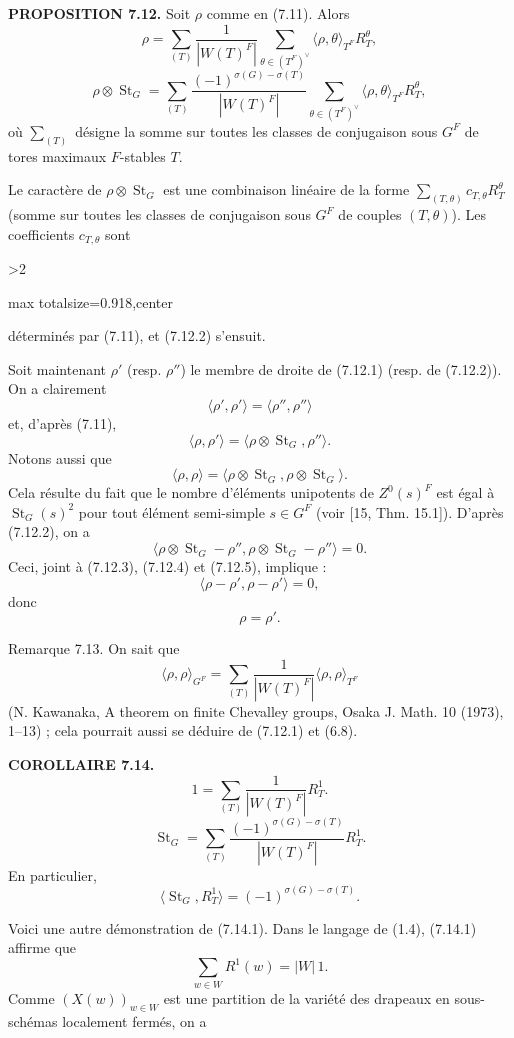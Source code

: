 \documentclass[9pt,twoside]{extarticle}
\newcommand{\EditionPage}[3]{%
  \ifnum#1>2\clearpage\fi
  \pdfbookmark[1]{Printed page #2}{fr-folio-#2}%
  \hypertarget{fr-physical-#1}{}%
  \noindent\begin{adjustbox}{max totalsize={\textwidth}{0.918\textheight},center}
  \begin{minipage}[t]{\textwidth}
  \fontsize{9.4}{11.1}\selectfont\justifying
  #3
  \end{minipage}
  \end{adjustbox}%
}
\begin{document}
{\noindent\textbf{PROPOSITION 7.12.} Soit \(\rho\) comme en (7.11). Alors \[
\tag{7.12.1}
\rho=
\sum_{(T)}\frac1{|W(T)^F|}
\sum_{\theta\in(T^F)^\vee}
\langle\rho,\theta\rangle_{T^F}R_T^\theta,
\]  \[
\tag{7.12.2}
\rho\otimes\operatorname{St}_G=
\sum_{(T)}\frac{(-1)^{\sigma(G)-\sigma(T)}}{|W(T)^F|}
\sum_{\theta\in(T^F)^\vee}
\langle\rho,\theta\rangle_{T^F}R_T^\theta,
\] où \(\sum_{(T)}\) désigne la somme sur toutes les classes de conjugaison sous \(G^F\) de tores maximaux \(F\)-stables \(T\).\par

Le caractère de \(\rho\otimes\operatorname{St}_G\) est une combinaison linéaire de la forme \(\sum_{(T,\theta)}c_{T,\theta}R_T^\theta\) (somme sur toutes les classes de conjugaison sous \(G^F\) de couples \((T,\theta)\)). Les coefficients \(c_{T,\theta}\) sont\par
}

\EditionPage{44}{145}{%
déterminés par (7.11), et (7.12.2) s'ensuit.\par

Soit maintenant \(\rho'\) (resp. \(\rho''\)) le membre de droite de (7.12.1) (resp. de (7.12.2)). On a clairement \[
\tag{7.12.3}
\langle\rho',\rho'\rangle=\langle\rho'',\rho''\rangle
\] et, d'après (7.11), \[
\tag{7.12.4}
\langle\rho,\rho'\rangle=\langle\rho\otimes\operatorname{St}_G,\rho''\rangle.
\] Notons aussi que \[
\tag{7.12.5}
\langle\rho,\rho\rangle
=
\langle\rho\otimes\operatorname{St}_G,\rho\otimes\operatorname{St}_G\rangle.
\] Cela résulte du fait que le nombre d'éléments unipotents de \(Z^0(s)^F\) est égal à \(\operatorname{St}_G(s)^2\) pour tout élément semi-simple \(s\in G^F\) (voir [15, Thm. 15.1]). D'après (7.12.2), on a \[
\langle\rho\otimes\operatorname{St}_G-\rho'',\rho\otimes\operatorname{St}_G-\rho''\rangle=0.
\] Ceci, joint à (7.12.3), (7.12.4) et (7.12.5), implique : \[
\langle\rho-\rho',\rho-\rho'\rangle=0,
\] donc \[
\rho=\rho'.
\]\par

Remarque 7.13. On sait que \[
\langle\rho,\rho\rangle_{G^F}
=
\sum_{(T)}\frac1{|W(T)^F|}\langle\rho,\rho\rangle_{T^F}
\] (N. Kawanaka, A theorem on finite Chevalley groups, Osaka J. Math. 10 (1973), 1--13) ; cela pourrait aussi se déduire de (7.12.1) et (6.8).\par

\noindent\textbf{COROLLAIRE 7.14.} \[
\tag{7.14.1}
1=\sum_{(T)}\frac1{|W(T)^F|}R_T^1.
\]  \[
\tag{7.14.2}
\operatorname{St}_G
=\sum_{(T)}\frac{(-1)^{\sigma(G)-\sigma(T)}}{|W(T)^F|}R_T^1.
\] En particulier, \[
\langle\operatorname{St}_G,R_T^1\rangle=(-1)^{\sigma(G)-\sigma(T)}.
\]\par

Voici une autre démonstration de (7.14.1). Dans le langage de (1.4), (7.14.1) affirme que \[
\sum_{w\in W}R^1(w)=|W|\,1.
\] Comme \((X(w))_{w\in W}\) est une partition de la variété des drapeaux en sous-schémas localement fermés, on a\par
}
\end{document}

